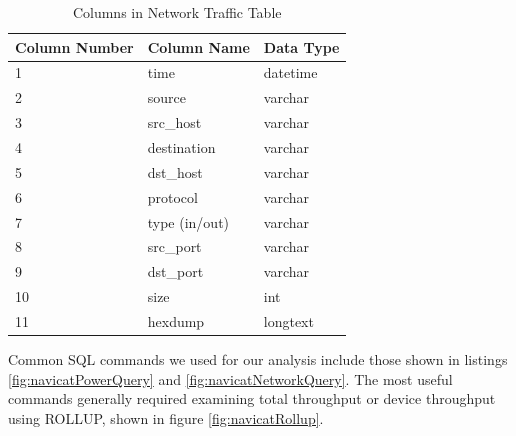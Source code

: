\begin{table}[H]
    \centering
    \caption{Columns in Network Traffic Table}
    \begin{tabular}{@{}lll@{}}
    \toprule
    Column Number & Column Name & Data Type \\ \midrule
    1             & time        & datetime  \\
    2             & source      & varchar   \\
    3             & src\_host   & varchar   \\
    4             & destination & varchar   \\
    5             & dst\_host   & varchar   \\
    6             & protocol    & varchar   \\
    7             & type (in/out)       & varchar   \\
    8             & src\_port   & varchar   \\
    9             & dst\_port   & varchar   \\
    10            & size        & int       \\
    11            & hexdump     & longtext  \\ \bottomrule
    \end{tabular}
    \label{tab:netcol}
    \end{table}
Common SQL commands we used for our analysis include those shown in listings \ref{fig:navicatPowerQuery} and \ref{fig:navicatNetworkQuery}. The most useful commands generally required examining total throughput or device throughput using ROLLUP, shown in figure \ref{fig:navicatRollup}.

